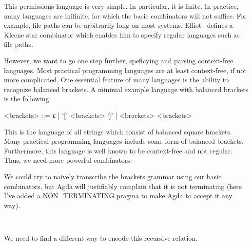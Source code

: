 This permissions language is very simple. In particular, it is finite. In practice, many languages are inifinite, for which the basic combinators will not suffice. For example, file paths can be arbitrarily long on most systems.
Elliot~\cite{conal-languages} defines a Kleene star combinator which enables him to specify regular languages such as file paths.

However, we want to go one step further, speficying and parsing context-free languages. Most practical programming languages are at least context-free, if not more complicated. One essential feature of many languages is the ability to recognize balanced brackets. A minimal example language with balanced brackets is the following:
%
\begin{grammar}
<brackets> ::= ε | `[' <brackets> `]' | <brackets> <brackets>
\end{grammar}
%
This is the language of all strings which consist of balanced square brackets. 
Many practical programming languages include some form of balanced brackets. Furthermore, this language is well known to be context-free and not regular. Thus, we need more powerful combinators.

We could try to naively transcribe the brackets grammar using our basic combinators, but Agda will justifiably complain that it is not terminating (here I've added a NON_TERMINATING pragma to make Agda to accept it any way).
%
\begin{code}%
%
\>[4]\AgdaSymbol{\{-\#}\AgdaSpace{}%
\AgdaSpace{}%
\AgdaSymbol{\#-\}}\<%
\\
%
\>[4]\AgdaSpace{}%
\AgdaSymbol{=}\AgdaSpace{}%
\AgdaSpace{}%
\AgdaSpace{}%
\AgdaSpace{}%
\AgdaString{'['}\AgdaSpace{}%
\AgdaSpace{}%
\AgdaSpace{}%
\AgdaSpace{}%
\AgdaSpace{}%
\AgdaString{']'}\AgdaSpace{}%
\AgdaSpace{}%
\AgdaSpace{}%
\AgdaSpace{}%
\<%
\end{code}
%
We need to find a different way to encode this recursive relation.

